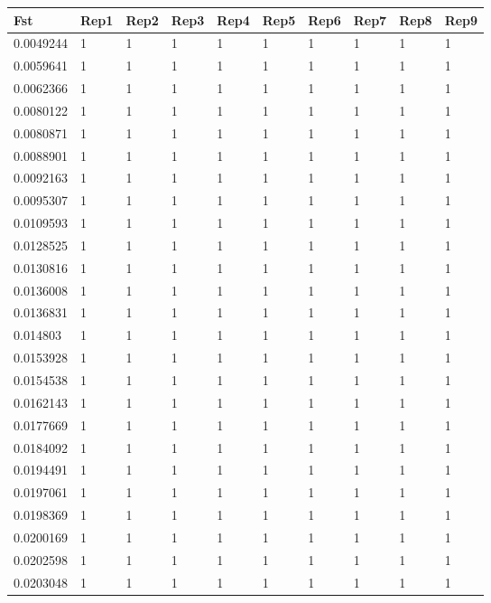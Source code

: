 \documentclass[varwidth=true, border={0, 15}]{standalone}
\begin{document}
\begin{table}[ht]
\centering
\begin{tabular}{llllllllll}
  \hline
Fst & Rep1 & Rep2 & Rep3 & Rep4 & Rep5 & Rep6 & Rep7 & Rep8 & Rep9 \\ 
  \hline
0.0049244 & 1 & 1 & 1 & 1 & 1 & 1 & 1 & 1 & 1 \\ 
  0.0059641 & 1 & 1 & 1 & 1 & 1 & 1 & 1 & 1 & 1 \\ 
  0.0062366 & 1 & 1 & 1 & 1 & 1 & 1 & 1 & 1 & 1 \\ 
  0.0080122 & 1 & 1 & 1 & 1 & 1 & 1 & 1 & 1 & 1 \\ 
  0.0080871 & 1 & 1 & 1 & 1 & 1 & 1 & 1 & 1 & 1 \\ 
  0.0088901 & 1 & 1 & 1 & 1 & 1 & 1 & 1 & 1 & 1 \\ 
  0.0092163 & 1 & 1 & 1 & 1 & 1 & 1 & 1 & 1 & 1 \\ 
  0.0095307 & 1 & 1 & 1 & 1 & 1 & 1 & 1 & 1 & 1 \\ 
  0.0109593 & 1 & 1 & 1 & 1 & 1 & 1 & 1 & 1 & 1 \\ 
  0.0128525 & 1 & 1 & 1 & 1 & 1 & 1 & 1 & 1 & 1 \\ 
  0.0130816 & 1 & 1 & 1 & 1 & 1 & 1 & 1 & 1 & 1 \\ 
  0.0136008 & 1 & 1 & 1 & 1 & 1 & 1 & 1 & 1 & 1 \\ 
  0.0136831 & 1 & 1 & 1 & 1 & 1 & 1 & 1 & 1 & 1 \\ 
  0.014803 & 1 & 1 & 1 & 1 & 1 & 1 & 1 & 1 & 1 \\ 
  0.0153928 & 1 & 1 & 1 & 1 & 1 & 1 & 1 & 1 & 1 \\ 
  0.0154538 & 1 & 1 & 1 & 1 & 1 & 1 & 1 & 1 & 1 \\ 
  0.0162143 & 1 & 1 & 1 & 1 & 1 & 1 & 1 & 1 & 1 \\ 
  0.0177669 & 1 & 1 & 1 & 1 & 1 & 1 & 1 & 1 & 1 \\ 
  0.0184092 & 1 & 1 & 1 & 1 & 1 & 1 & 1 & 1 & 1 \\ 
  0.0194491 & 1 & 1 & 1 & 1 & 1 & 1 & 1 & 1 & 1 \\ 
  0.0197061 & 1 & 1 & 1 & 1 & 1 & 1 & 1 & 1 & 1 \\ 
  0.0198369 & 1 & 1 & 1 & 1 & 1 & 1 & 1 & 1 & 1 \\ 
  0.0200169 & 1 & 1 & 1 & 1 & 1 & 1 & 1 & 1 & 1 \\ 
  0.0202598 & 1 & 1 & 1 & 1 & 1 & 1 & 1 & 1 & 1 \\ 
  0.0203048 & 1 & 1 & 1 & 1 & 1 & 1 & 1 & 1 & 1 \\ 

\end{tabular}
\end{table}
\end{document}
